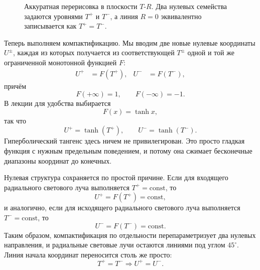 \begin{figure}[htbp]
\centering
{}
\caption{Аккуратная перерисовка в плоскости \(T\)-\(R\). Два нулевых семейства задаются уровнями \(T^+\) и \(T^-\), а линия \(R=0\) эквивалентно записывается как \(T^+=T^-\).}
\end{figure}

Теперь выполняем компактификацию. Мы вводим две новые нулевые координаты \(U^\pm\), каждая из которых получается из соответствующей \(T^\pm\) одной и той же ограниченной монотонной функцией \(F\):
\begin{align}
U^+ &= F(T^+), &
U^- &= F(T^-),
\end{align}
причём
\begin{equation}
F(+\infty)=1,
\qquad
F(-\infty)=-1.
\end{equation}
В лекции для удобства выбирается
\begin{equation}
F(x)=\tanh x,
\end{equation}
так что
\begin{equation}
U^+ = \tanh(T^+),
\qquad
U^- = \tanh(T^-).
\end{equation}
Гиперболический тангенс здесь ничем не привилегирован. Это просто гладкая функция с нужным предельным поведением, и потому она сжимает бесконечные диапазоны координат до конечных.

Нулевая структура сохраняется по простой причине. Если для входящего радиального светового луча выполняется \(T^+=\text{const}\), то
\[
U^+=F(T^+)=\text{const},
\]
и аналогично, если для исходящего радиального светового луча выполняется \(T^-=\text{const}\), то
\[
U^-=F(T^-)=\text{const}.
\]
Таким образом, компактификация по отдельности перепараметризует два нулевых направления, и радиальные световые лучи остаются линиями под углом \(45^\circ\). Линия начала координат переносится столь же просто:
\[
T^+=T^- \Longrightarrow U^+=U^-.
\]


